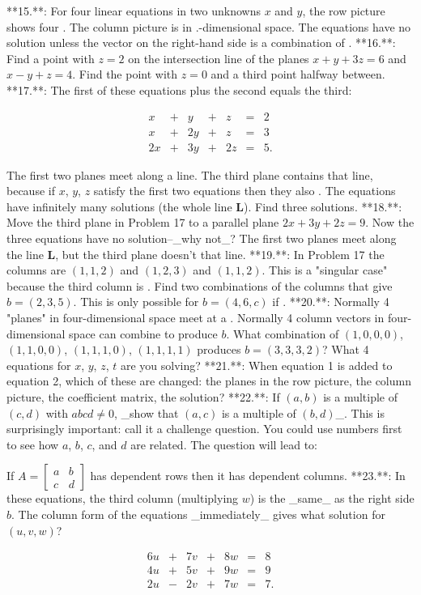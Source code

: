 

**15.**: For four linear equations in two unknowns \(x\) and \(y\), the row picture shows four . The column picture is in .-dimensional space. The equations have no solution unless the vector on the right-hand side is a combination of .
**16.**: Find a point with \(z=2\) on the intersection line of the planes \(x+y+3z=6\) and \(x-y+z=4\). Find the point with \(z=0\) and a third point halfway between.
**17.**: The first of these equations plus the second equals the third:

\[\begin{array}{ccccccc}x&+&y&+&z&=&2\\ x&+&2y&+&z&=&3\\ 2x&+&3y&+&2z&=&5.\end{array}\]

The first two planes meet along a line. The third plane contains that line, because if \(x\), \(y\), \(z\) satisfy the first two equations then they also . The equations have infinitely many solutions (the whole line \(\mathbf{L}\)). Find three solutions.
**18.**: Move the third plane in Problem 17 to a parallel plane \(2x+3y+2z=9\). Now the three equations have no solution--_why not_? The first two planes meet along the line \(\mathbf{L}\), but the third plane doesn't that line.
**19.**: In Problem 17 the columns are \((1,1,2)\) and \((1,2,3)\) and \((1,1,2)\). This is a "singular case" because the third column is . Find two combinations of the columns that give \(b=(2,3,5)\). This is only possible for \(b=(4,6,c)\) if .
**20.**: Normally 4 "planes" in four-dimensional space meet at a . Normally 4 column vectors in four-dimensional space can combine to produce \(b\). What combination of \((1,0,0,0)\), \((1,1,0,0)\), \((1,1,1,0)\), \((1,1,1,1)\) produces \(b=(3,3,3,2)\)? What 4 equations for \(x\), \(y\), \(z\), \(t\) are you solving?
**21.**: When equation 1 is added to equation 2, which of these are changed: the planes in the row picture, the column picture, the coefficient matrix, the solution?
**22.**: If \((a,b)\) is a multiple of \((c,d)\) with \(abcd\neq 0\), _show that \((a,c)\) is a multiple of \((b,d)\)_. This is surprisingly important: call it a challenge question. You could use numbers first to see how \(a\), \(b\), \(c\), and \(d\) are related. The question will lead to:

If \(A=\left[\begin{smallmatrix}a&b\\ c&d\end{smallmatrix}\right]\) has dependent rows then it has dependent columns.
**23.**: In these equations, the third column (multiplying \(w\)) is the _same_ as the right side \(b\). The column form of the equations _immediately_ gives what solution for \((u,v,w)\)?

\[\begin{array}{ccccccc}6u&+&7v&+&8w&=&8\\ 4u&+&5v&+&9w&=&9\\ 2u&-&2v&+&7w&=&7.\end{array}\]